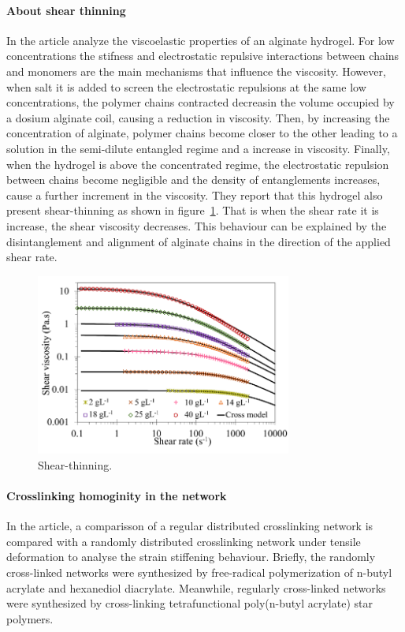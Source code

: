 \paragraph{About shear thinning}
In the article\citep{varela-feijooMultiscaleInvestigationViscoelastic2023} analyze the viscoelastic properties of an alginate hydrogel.
For low concentrations the stifness and electrostatic repulsive interactions between chains and monomers are the main mechanisms that influence the viscosity.
However, when salt it is added to screen the electrostatic repulsions at the same low concentrations, the polymer chains contracted decreasin the volume occupied by a dosium alginate coil, causing a reduction in viscosity.
Then, by increasing the concentration of alginate, polymer chains become closer to the other leading to a solution in the semi-dilute entangled regime and a increase in viscosity.
Finally, when the hydrogel is above the concentrated regime, the electrostatic repulsion between chains become negligible and the density of entanglements increases, cause a further increment in the viscosity.
They report that this hydrogel also present shear-thinning as shown in figure~\ref{fig:hydroMechResponse2}.
That is when the shear rate it is increase, the shear viscosity decreases.
This behaviour can be explained by the disintanglement and alignment of alginate chains in the direction of the applied shear rate.

\begin{figure}[ht!]
    \centering
    \includegraphics[width=0.75\textwidth]{figs/explainMechResponse/alginateShearThinning.png}
    \caption{Shear-thinning\citep{varela-feijooMultiscaleInvestigationViscoelastic2023}.}\label{fig:hydroMechResponse2}
\end{figure}

\paragraph{Crosslinking homoginity in the network}
In the article\citep{kongEffectCrossLinkHomogeneity2024}, a comparisson of a regular distributed crosslinking network is compared with a randomly distributed crosslinking network under tensile deformation to analyse the strain stiffening behaviour.
Briefly, the randomly cross-linked networks were synthesized by free-radical polymerization of n-butyl acrylate and hexanediol diacrylate. 
Meanwhile, regularly cross-linked networks were synthesized by cross-linking tetrafunctional poly(n-butyl acrylate) star polymers.

